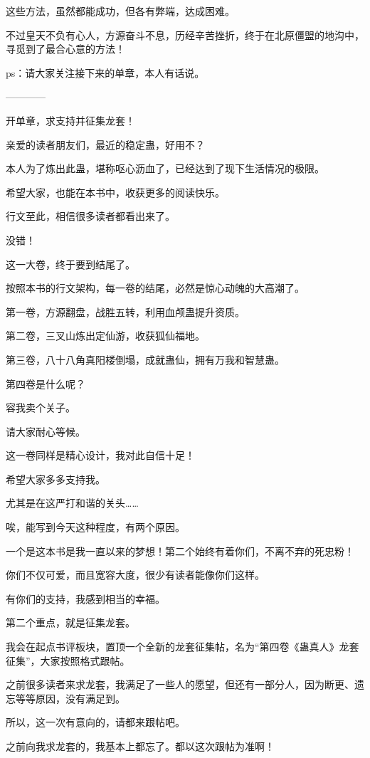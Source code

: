 \begin{this_body}
这些方法，虽然都能成功，但各有弊端，达成困难。

不过皇天不负有心人，方源奋斗不息，历经辛苦挫折，终于在北原僵盟的地沟中，寻觅到了最合心意的方法！

ps：请大家关注接下来的单章，本人有话说。

------------

开单章，求支持并征集龙套！

亲爱的读者朋友们，最近的稳定蛊，好用不？

本人为了炼出此蛊，堪称呕心沥血了，已经达到了现下生活情况的极限。

希望大家，也能在本书中，收获更多的阅读快乐。

行文至此，相信很多读者都看出来了。

没错！

这一大卷，终于要到结尾了。

按照本书的行文架构，每一卷的结尾，必然是惊心动魄的大高潮了。

第一卷，方源翻盘，战胜五转，利用血颅蛊提升资质。

第二卷，三叉山炼出定仙游，收获狐仙福地。

第三卷，八十八角真阳楼倒塌，成就蛊仙，拥有万我和智慧蛊。

第四卷是什么呢？

容我卖个关子。

请大家耐心等候。

这一卷同样是精心设计，我对此自信十足！

希望大家多多支持我。

尤其是在这严打和谐的关头……

唉，能写到今天这种程度，有两个原因。

一个是这本书是我一直以来的梦想！第二个始终有着你们，不离不弃的死忠粉！

你们不仅可爱，而且宽容大度，很少有读者能像你们这样。

有你们的支持，我感到相当的幸福。

第二个重点，就是征集龙套。

我会在起点书评板块，置顶一个全新的龙套征集帖，名为“第四卷《蛊真人》龙套征集”，大家按照格式跟帖。

之前很多读者来求龙套，我满足了一些人的愿望，但还有一部分人，因为断更、遗忘等等原因，没有满足到。

所以，这一次有意向的，请都来跟帖吧。

之前向我求龙套的，我基本上都忘了。都以这次跟帖为准啊！

\end{this_body}

